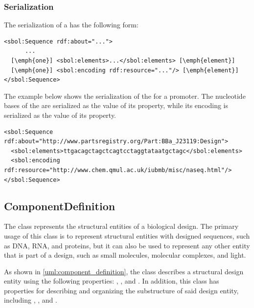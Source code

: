 \subsubsection*{Serialization}
The serialization of a  has the following form:
\begin{lstlisting}
<sbol:Sequence rdf:about="...">
      ...
  [\emph{one}] <sbol:elements>...</sbol:elements> [\emph{element}]
  [\emph{one}] <sbol:encoding rdf:resource="..."/> [\emph{element}]
</sbol:Sequence>
\end{lstlisting}

The example below shows the serialization of the  for a promoter. The nucleotide bases of the  are serialized as the  value of its  property, while its  encoding is serialized as the  value of its   property. 

\begin{lstlisting}
<sbol:Sequence rdf:about="http://www.partsregistry.org/Part:BBa_J23119:Design">
  <sbol:elements>ttgacagctagctcagtcctaggtataatgctagc</sbol:elements>
  <sbol:encoding rdf:resource="http://www.chem.qmul.ac.uk/iubmb/misc/naseq.html"/>
</sbol:Sequence>
\end{lstlisting}


\subsection{ComponentDefinition}
\label{sec:ComponentDefinition}

The  class represents the structural entities of a biological design. The primary usage of this class is to represent structural entities with designed sequences, such as DNA, RNA, and proteins, but it can also be used to represent any other entity that is part of a design, such as small molecules, molecular complexes, and light. 

As shown in \ref{uml:component_definition}, the  class describes a structural design entity using the following properties: , , and . In addition, this class has properties for describing and organizing the substructure of said design entity, including , , and  .

